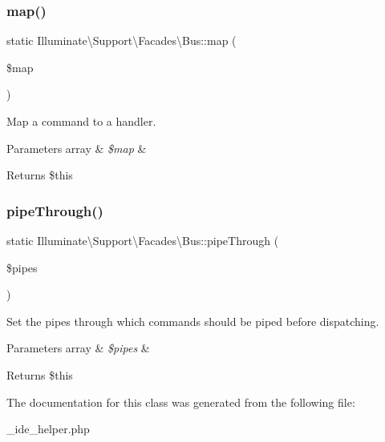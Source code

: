 \subsubsection{\texorpdfstring{map()}{map()}}
{\footnotesize\ttfamily static Illuminate\textbackslash{}\+Support\textbackslash{}\+Facades\textbackslash{}\+Bus\+::map (\begin{DoxyParamCaption}\item[{}]{\$map }\end{DoxyParamCaption})\hspace{0.3cm}{\ttfamily [static]}}

Map a command to a handler.


\begin{DoxyParams}[1]{Parameters}
array & {\em \$map} & \\
\hline
\end{DoxyParams}
\begin{DoxyReturn}{Returns}
\$this 
\end{DoxyReturn}
\mbox{\label{class_illuminate_1_1_support_1_1_facades_1_1_bus_ad04e2fde658dcbb3e583365f665c7381}} 
\subsubsection{\texorpdfstring{pipe\+Through()}{pipeThrough()}}
{\footnotesize\ttfamily static Illuminate\textbackslash{}\+Support\textbackslash{}\+Facades\textbackslash{}\+Bus\+::pipe\+Through (\begin{DoxyParamCaption}\item[{}]{\$pipes }\end{DoxyParamCaption})\hspace{0.3cm}{\ttfamily [static]}}

Set the pipes through which commands should be piped before dispatching.


\begin{DoxyParams}[1]{Parameters}
array & {\em \$pipes} & \\
\hline
\end{DoxyParams}
\begin{DoxyReturn}{Returns}
\$this 
\end{DoxyReturn}


The documentation for this class was generated from the following file\+:\begin{DoxyCompactItemize}
\item 
\+\_\+ide\+\_\+helper.\+php\end{DoxyCompactItemize}
